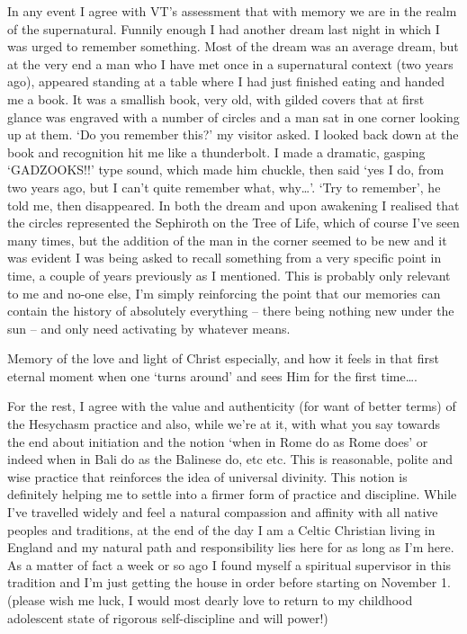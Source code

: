 \begin{footnotesize}
\begin{sffamily}
In any event I agree with VT's assessment that with memory we are in the realm of the supernatural. Funnily enough I had another dream last night in which I was urged to remember something. Most of the dream was an average dream, but at the very end a man who I have met once in a supernatural context (two years ago), appeared standing at a table where I had just finished eating and handed me a book. It was a smallish book, very old, with gilded covers that at first glance was engraved with a number of circles and a man sat in one corner looking up at them. `Do you remember this?' my visitor asked. I looked back down at the book and recognition hit me like a thunderbolt. I made a dramatic, gasping `GADZOOKS!!' type sound, which made him chuckle, then said `yes I do, from two years ago, but I can't quite remember what, why…’. ‘Try to remember’, he told me, then disappeared. In both the dream and upon awakening I realised that the circles represented the Sephiroth on the Tree of Life, which of course I've seen many times, but the addition of the man in the corner seemed to be new and it was evident I was being asked to recall something from a very specific point in time, a couple of years previously as I mentioned. This is probably only relevant to me and no-one else, I'm simply reinforcing the point that our memories can contain the history of absolutely everything – there being nothing new under the sun – and only need activating by whatever means. 

Memory of the love and light of Christ especially, and how it feels in that first eternal moment when one `turns around' and sees Him for the first time….

For the rest, I agree with the value and authenticity (for want of better terms) of the Hesychasm practice and also, while we're at it, with what you say towards the end about initiation and the notion `when in Rome do as Rome does' or indeed when in Bali do as the Balinese do, etc etc. This is reasonable, polite and wise practice that reinforces the idea of universal divinity. This notion is definitely helping me to settle into a firmer form of practice and discipline. While I've travelled widely and feel a natural compassion and affinity with all native peoples and traditions, at the end of the day I am a Celtic Christian living in England and my natural path and responsibility lies here for as long as I'm here. As a matter of fact a week or so ago I found myself a spiritual supervisor in this tradition and I'm just getting the house in order before starting on November 1. (please wish me luck, I would most dearly love to return to my childhood adolescent state of rigorous self-discipline and will power!)


\end{sffamily}
\end{footnotesize}
